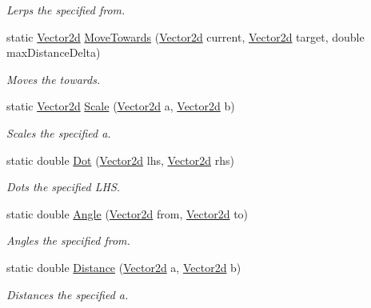 \begin{DoxyCompactItemize}
\begin{DoxyCompactList}\small\item\em Lerps the specified from. \end{DoxyCompactList}\item 
static \hyperlink{struct_unity_engine_1_1_vector2d}{Vector2d} \hyperlink{struct_unity_engine_1_1_vector2d_a6d10845548c9a0eacf2b3e9ca6a39cf1}{Move\+Towards} (\hyperlink{struct_unity_engine_1_1_vector2d}{Vector2d} current, \hyperlink{struct_unity_engine_1_1_vector2d}{Vector2d} target, double max\+Distance\+Delta)
\begin{DoxyCompactList}\small\item\em Moves the towards. \end{DoxyCompactList}\item 
static \hyperlink{struct_unity_engine_1_1_vector2d}{Vector2d} \hyperlink{struct_unity_engine_1_1_vector2d_a2dd7f076846a37be822ef2a34c7c89e3}{Scale} (\hyperlink{struct_unity_engine_1_1_vector2d}{Vector2d} a, \hyperlink{struct_unity_engine_1_1_vector2d}{Vector2d} b)
\begin{DoxyCompactList}\small\item\em Scales the specified a. \end{DoxyCompactList}\item 
static double \hyperlink{struct_unity_engine_1_1_vector2d_a0e097e6f478e4a1b7c4d5760e5909ec7}{Dot} (\hyperlink{struct_unity_engine_1_1_vector2d}{Vector2d} lhs, \hyperlink{struct_unity_engine_1_1_vector2d}{Vector2d} rhs)
\begin{DoxyCompactList}\small\item\em Dots the specified L\+HS. \end{DoxyCompactList}\item 
static double \hyperlink{struct_unity_engine_1_1_vector2d_a9a37829a34f1ce629b91c335842f842c}{Angle} (\hyperlink{struct_unity_engine_1_1_vector2d}{Vector2d} from, \hyperlink{struct_unity_engine_1_1_vector2d}{Vector2d} to)
\begin{DoxyCompactList}\small\item\em Angles the specified from. \end{DoxyCompactList}\item 
static double \hyperlink{struct_unity_engine_1_1_vector2d_a12f6521fad98bcb5ccbd9fddf49a0833}{Distance} (\hyperlink{struct_unity_engine_1_1_vector2d}{Vector2d} a, \hyperlink{struct_unity_engine_1_1_vector2d}{Vector2d} b)
\begin{DoxyCompactList}\small\item\em Distances the specified a. \end{DoxyCompactList}\item 

\end{DoxyCompactItemize}
